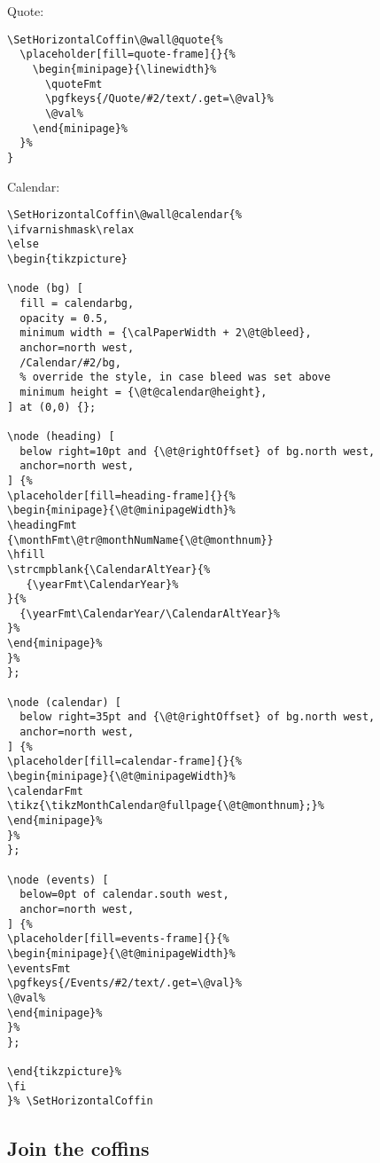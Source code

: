 \documentclass[11pt,oneside]{memoir-article}
\begin{document}
Quote:

\begin{verbatim}
\SetHorizontalCoffin\@wall@quote{%
  \placeholder[fill=quote-frame]{}{%
    \begin{minipage}{\linewidth}%
      \quoteFmt
      \pgfkeys{/Quote/#2/text/.get=\@val}%
      \@val%
    \end{minipage}%
  }%
}
\end{verbatim}

Calendar:

\begin{verbatim}
\SetHorizontalCoffin\@wall@calendar{%
\ifvarnishmask\relax
\else
\begin{tikzpicture}

\node (bg) [
  fill = calendarbg,
  opacity = 0.5,
  minimum width = {\calPaperWidth + 2\@t@bleed},
  anchor=north west,
  /Calendar/#2/bg,
  % override the style, in case bleed was set above
  minimum height = {\@t@calendar@height},
] at (0,0) {};

\node (heading) [
  below right=10pt and {\@t@rightOffset} of bg.north west,
  anchor=north west,
] {%
\placeholder[fill=heading-frame]{}{%
\begin{minipage}{\@t@minipageWidth}%
\headingFmt
{\monthFmt\@tr@monthNumName{\@t@monthnum}}
\hfill
\strcmpblank{\CalendarAltYear}{%
   {\yearFmt\CalendarYear}%
}{%
  {\yearFmt\CalendarYear/\CalendarAltYear}%
}%
\end{minipage}%
}%
};

\node (calendar) [
  below right=35pt and {\@t@rightOffset} of bg.north west,
  anchor=north west,
] {%
\placeholder[fill=calendar-frame]{}{%
\begin{minipage}{\@t@minipageWidth}%
\calendarFmt
\tikz{\tikzMonthCalendar@fullpage{\@t@monthnum};}%
\end{minipage}%
}%
};

\node (events) [
  below=0pt of calendar.south west,
  anchor=north west,
] {%
\placeholder[fill=events-frame]{}{%
\begin{minipage}{\@t@minipageWidth}%
\eventsFmt
\pgfkeys{/Events/#2/text/.get=\@val}%
\@val%
\end{minipage}%
}%
};

\end{tikzpicture}%
\fi
}% \SetHorizontalCoffin
\end{verbatim}

\subsection{Join the coffins}
\label{sec:orgd6fae30}
\end{document}
